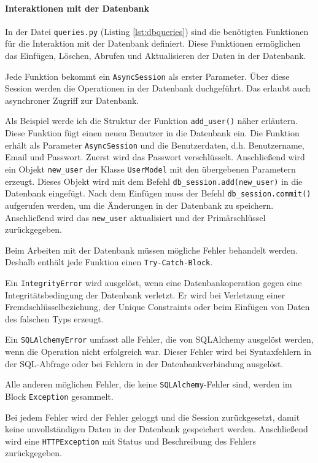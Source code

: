 \documentclass[12pt, letterpaper]{article}
\begin{document}
  \paragraph{Interaktionen mit der Datenbank}
  \textbf{}
  \par In der Datei \texttt{queries.py} (Listing \ref{lst:dbqueries}) sind die benötigten Funktionen für die Interaktion mit der Datenbank definiert. Diese Funktionen ermöglichen das Einfügen, Löschen, Abrufen und Aktualisieren der Daten in der Datenbank.
  \par Jede Funktion bekommt ein \texttt{AsyncSession} als erster Parameter. Über diese Session werden die Operationen in der Datenbank duchgeführt. Das erlaubt auch asynchroner Zugriff zur Datenbank.
  \par Als Beispiel werde ich die Struktur der Funktion \texttt{add\_user()} näher erläutern. Diese Funktion fügt einen neuen Benutzer in die Datenbank ein. Die Funktion erhält als Parameter \texttt{AsyncSession} und die Benutzerdaten, d.h. Benutzername, Email und Passwort. Zuerst wird das Passwort verschlüsselt. Anschließend wird ein Objekt \texttt{new\_user} der Klasse \texttt{UserModel} mit den übergebenen Parametern erzeugt. Dieses Objekt wird mit dem Befehl \texttt{db\_session.add(new\_user)} in die Datenbank eingefügt. Nach dem Einfügen muss der Befehl \texttt{db\_session.commit()} aufgerufen werden, um die Änderungen in der Datenbank zu speichern. Anschließend wird das \texttt{new\_user} aktualisiert und der Primärschlüssel zurückgegeben.
  \par Beim Arbeiten mit der Datenbank müssen mögliche Fehler behandelt werden. Deshalb enthält jede Funktion einen \texttt{Try-Catch-Block}. 
  \par Ein \texttt{IntegrityError} wird ausgelöst, wenn eine Datenbankoperation gegen eine Integritätsbedingung der Datenbank verletzt. Er wird bei Verletzung einer Fremdschlüsselbeziehung, der Unique Constraints oder beim Einfügen von Daten des falschen Typs erzeugt. 
  \par Ein \texttt{SQLAlchemyError} umfasst alle Fehler, die von SQLAlchemy ausgelöst werden, wenn die Operation nicht erfolgreich war. Dieser Fehler wird bei Syntaxfehlern in der SQL-Abfrage oder bei Fehlern in der Datenbankverbindung ausgelöst.
  \par Alle anderen möglichen Fehler, die keine \texttt{SQLAlchemy}-Fehler sind, werden im Block \texttt{Exception} gesammelt.
  \par Bei jedem Fehler wird der Fehler geloggt und die Session zurückgesetzt, damit keine unvollständigen Daten in der Datenbank gespeichert werden. Anschließend wird eine \texttt{HTTPException} mit Status und Beschreibung des Fehlers zurückgegeben.
\end{document}
